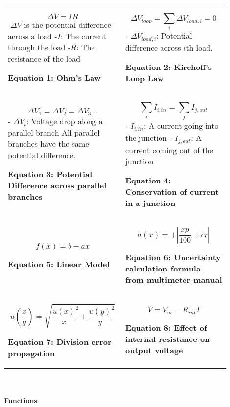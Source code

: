 \documentclass[
	letterpaper, %
	10pt, %
]{CSUniSchoolLabReport}
\begin{document}
\begin{tabular}{p{0.45\linewidth} p{0.45\linewidth}}
    $$\Delta V = IR$$
    -$\Delta V$ is the potential difference across a load\newline
    -$I$: The current through the load\newline
    -$R$: The resistance of the load
    \begin{center}
        \textbf{Equation 1: Ohm's Law}
    \end{center}
    &
    $$\Delta V_{loop} = \sum_i \Delta V_{load, i} = 0$$
    - $\Delta V_{load,i}$: Potential difference across $i$th load.
    \begin{center}
        \textbf{Equation 2: Kirchoff's Loop Law}
    \end{center}\\
    $$\Delta V_1 = \Delta V_2 = \Delta V_3 ...$$
    - $\Delta V_{i}$: Voltage drop along a parallel branch\newline
    All parallel branches have the same potential\newline
    difference.
    \begin{center}
        \textbf{Equation 3: Potential Difference across parallel branches}
    \end{center}
    &
    $$\sum_i I_{i, in} = \sum_j I_{j,out}$$
    - $I_{i, in}$: A current going into the junction\newline
    - $I_{j,out}$: A current coming out of the junction
    \begin{center}
        \textbf{Equation 4: Conservation of current in a junction}
    \end{center}\\
    $$f(x) = b-ax$$
    \begin{center}
        \textbf{Equation 5: Linear Model}
    \end{center}
    &
    $$ u(x) = \pm\left|\frac{xp}{100} + c r\right|$$
    \begin{center}
        \textbf{Equation 6: Uncertainty calculation formula from multimeter manual}
    \end{center}\\
    $$ u\left(\frac{x}{y}\right) = \sqrt{\frac{u(x)}{x}^2 + \frac{u(y)}{y}^2}$$
    \begin{center}
        \textbf{Equation 7: Division error propagation}
    \end{center}
    &
    $$V = V_\infty - R_{int}I$$
    \begin{center}
        \textbf{Equation 8: Effect of internal resistance on output voltage}
    \end{center}
\end{tabular}\\\\
\newpage
{\large\textbf{Functions}}\\
\end{document}
